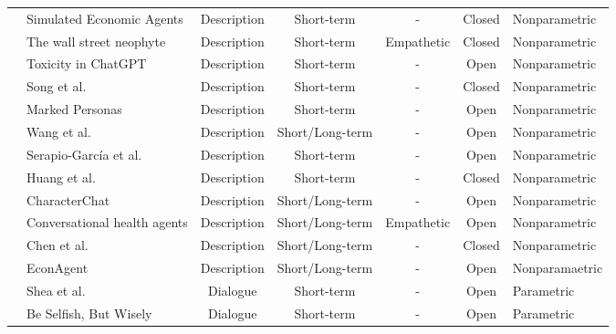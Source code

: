 \begin{table}[!htp]
{\begin{tabularx}{\linewidth}{c|>{\centering\arraybackslash}X|c|c|c|c|>{\centering\arraybackslash}m{8em}}
    \cmidrule{2-7}
    & Simulated Economic Agents \cite{horton2023largelanguagemodelssimulated} & Description & Short-term & - & Closed  & Nonparametric  \\
    \cmidrule{2-7}
    & The wall street neophyte \cite{xie2023wallstreetneophytezeroshot} & Description & Short-term & Empathetic & Closed  & Nonparametric  \\
    \cmidrule{2-7}
    & Toxicity in ChatGPT \cite{deshpande2023toxicitychatgptanalyzingpersonaassigned} & Description & Short-term & - & Open  & Nonparametric  \\
    \cmidrule{2-7}
    & Song et al. \cite{song2023largelanguagemodelsdeveloped} & Description & Short-term & - & Closed  & Nonparametric  \\
    \cmidrule{2-7}
    & Marked Personas \cite{cheng2023markedpersonasusingnatural} & Description & Short-term & - & Open  & Nonparametric  \\
    \cmidrule{2-7}
    & Wang et al. \cite{wang2024userbehaviorsimulationlarge} & Description & Short/Long-term & - & Open  & Nonparametric  \\
    \cmidrule{2-7}
    & Serapio-García et al. \cite{serapiogarcía2023personalitytraitslargelanguage} & Description & Short-term & - & Open  & Nonparametric  \\
    \cmidrule{2-7}
    & Huang et al. \cite{huang2024emotionallynumbempatheticevaluating} & Description & Short-term & - & Closed  & Nonparametric  \\
    \cmidrule{2-7}
    & CharacterChat \cite{tu2023characterchatlearningconversationalai} & Description & Short/Long-term & - & Open  & Nonparametric  \\
    \cmidrule{2-7}
    & Conversational health agents \cite{abbasian2024conversationalhealthagentspersonalized} & Description & Short/Long-term & Empathetic & Open  & Nonparametric  \\
    \cmidrule{2-7}
    & Chen et al. \cite{chen2024moneymouthisevaluating} & Description & Short/Long-term & - & Closed  & Nonparametric  \\
    \cmidrule{2-7}
    & EconAgent \cite{li2024econagentlargelanguagemodelempowered} & Description & Short/Long-term & - & Open  & Nonparamaetric  \\
    \cmidrule{2-7}
    & Shea et al. \cite{shea2023buildingpersonaconsistentdialogue} & Dialogue & Short-term & - & Open  & Parametric  \\
    \cmidrule{2-7}
    & Be Selfish, But Wisely \cite{chawla2023selfishwiselyinvestigatingimpact} & Dialogue & Short-term & - & Open  & Parametric  \\

\end{tabularx}}
\end{table}
